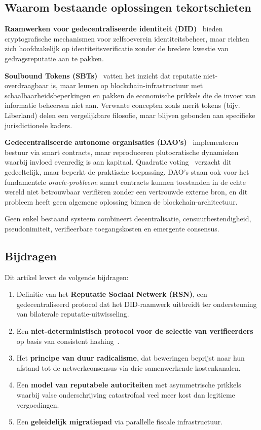 \documentclass[11pt,a4paper,twocolumn]{article}
\begin{document}
\subsection{Waarom bestaande oplossingen tekortschieten}

\textbf{Raamwerken voor gedecentraliseerde identiteit (DID)}~\cite{did2022} bieden cryptografische mechanismen voor zelfsoeverein identiteitsbeheer, maar richten zich hoofdzakelijk op identiteitsverificatie zonder de bredere kwestie van gedragsreputatie aan te pakken.

\textbf{Soulbound Tokens (SBTs)}~\cite{weyl2022} vatten het inzicht dat reputatie niet-overdraagbaar is, maar leunen op blockchain-infrastructuur met schaalbaarheidsbeperkingen en pakken de economische prikkels die de invoer van informatie beheersen niet aan. Verwante concepten zoals merit tokens (bijv. Liberland) delen een vergelijkbare filosofie, maar blijven gebonden aan specifieke jurisdictionele kaders.

\textbf{Gedecentraliseerde autonome organisaties (DAO's)}~\cite{buterin2014} implementeren bestuur via smart contracts, maar reproduceren plutocratische dynamieken waarbij invloed evenredig is aan kapitaal. Quadratic voting~\cite{buterin2019} verzacht dit gedeeltelijk, maar beperkt de praktische toepassing. DAO's staan ook voor het fundamentele \emph{oracle-probleem}: smart contracts kunnen toestanden in de echte wereld niet betrouwbaar verifiëren zonder een vertrouwde externe bron, en dit probleem heeft geen algemene oplossing binnen de blockchain-architectuur.

Geen enkel bestaand systeem combineert decentralisatie, censuurbestendigheid, pseudonimiteit, verifieerbare toegangskosten en emergente consensus.

\subsection{Bijdragen}

Dit artikel levert de volgende bijdragen:
\begin{enumerate}[nosep]
\item Definitie van het \textbf{Reputatie Sociaal Netwerk (RSN)}, een gedecentraliseerd protocol dat het DID-raamwerk uitbreidt ter ondersteuning van bilaterale reputatie-uitwisseling.
\item Een \textbf{niet-deterministisch protocol voor de selectie van verifieerders} op basis van consistent hashing~\cite{karger1997}.
\item Het \textbf{principe van duur radicalisme}, dat beweringen beprijst naar hun afstand tot de netwerkconsensus via drie samenwerkende kostenkanalen.
\item Een \textbf{model van reputabele autoriteiten} met asymmetrische prikkels waarbij valse onderschrijving catastrofaal veel meer kost dan legitieme vergoedingen.
\item Een \textbf{geleidelijk migratiepad} via parallelle fiscale infrastructuur.
\end{enumerate}
\end{document}
